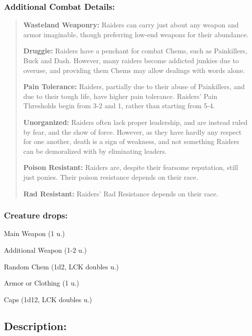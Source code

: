 \documentclass[11pt,a4paper,twocolumn]{book}
\begin{document}
	\subsubsection*{Additional Combat Details:}
	\begin{verse}
		\textbf{Wasteland Weaponry:} Raiders can carry just about any weapon and armor imaginable, though preferring low-end weapons for their abundance. 
		
		\textbf{Druggie:} Raiders have a penchant for combat Chems, such as Painkillers, Buck and Dash. However, many raiders become addicted junkies due to overuse, and providing them Chems may allow dealings with words alone.
		
		\textbf{Pain Tolerance:} Raiders, partially due to their abuse of Painkillers, and due to their tough life, have higher pain tolerance. Raiders' Pain Thresholds begin from 3-2 and 1, rather than starting from 5-4.
		
		\textbf{Unorganized:} Raiders often lack proper leadership, and are instead ruled by fear, and the show of force. However, as they have hardly any  respect for one another, death is a sign of weakness, and not something Raiders can be demoralized with by eliminating leaders.
		
		\textbf{Poison Resistant:} Raiders are, despite their fearsome reputation, still just ponies. Their poison resistance depends on their race.
		
		\textbf{Rad Resistant:} Raiders' Rad Resistance depends on their race.
	\end{verse}
	
	\subsubsection*{Creature drops:}
	\begin{compactitem}
		\item Main Weapon (1 u.)
		\item Additional Weapon (1-2 u.)
		\item Random Chem (1d2, LCK doubles u.)
		\item Armor or Clothing (1 u.)
		\item Caps (1d12, LCK doubles u.)
	\end{compactitem}
	
	\subsection*{Description:}
	
\end{document}
